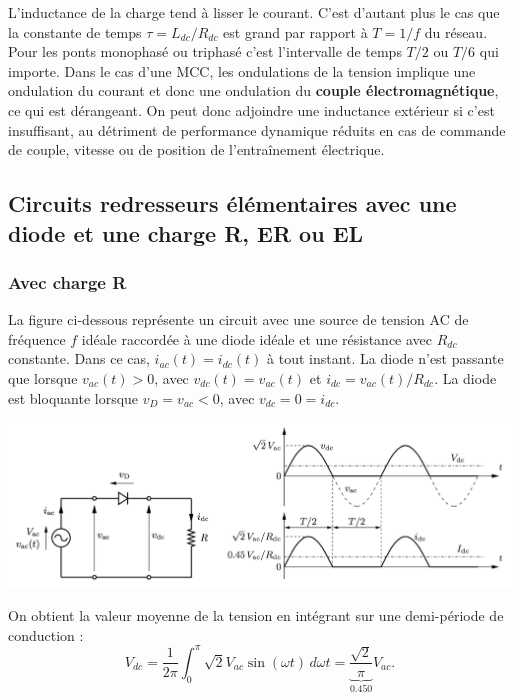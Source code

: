 			L'inductance de la charge tend à lisser le courant. C'est d'autant plus le cas que la constante de temps $\tau = L_{dc}/R_{dc}$ est grand par rapport à $T=1/f$ du réseau. Pour les ponts monophasé ou triphasé c'est l'intervalle de temps $T/2$ ou $T/6$ qui importe. Dans le cas d'une MCC, les ondulations de la tension implique une ondulation du courant et donc une ondulation du \textbf{couple électromagnétique}, ce qui est dérangeant. On peut donc adjoindre une inductance extérieur si c'est insuffisant, au détriment de performance dynamique réduits en cas de commande de couple, vitesse ou de position de l'entraînement électrique. 
			
		\subsection{Circuits redresseurs élémentaires avec une diode et une charge R, ER ou EL}
			\subsubsection{Avec charge R}
				La figure ci-dessous représente un circuit avec une source de tension AC de fréquence $f$ idéale raccordée à une diode idéale et une résistance avec $R_{dc}$ constante. Dans ce cas, $i_{ac}(t)=i_{dc}(t)$ à tout instant. La diode n'est passante que lorsque $v_{ac}(t)>0$, avec $v_{dc}(t)=v_{ac}(t)$ et $i_{dc}=v_{ac}(t)/R_{dc}$. La diode est bloquante lorsque $v_D=v_{ac}<0$, avec $v_{dc}=0=i_{dc}$.
				
				\begin{center}
					\includegraphics[scale=0.45]{ch2/3}
				\end{center}
				
				On obtient la valeur moyenne de la tension en intégrant sur une demi-période de conduction :
				\begin{equation}
					V_{dc} = \frac{1}{2\pi} \int _0^\pi \sqrt{2}V_{ac}\sin (\omega t) \, d\omega t = \underbrace{\frac{\sqrt{2}}{\pi}}_{0.450} V_{ac}.
					\label{eq:2.5}
				\end{equation}
				
